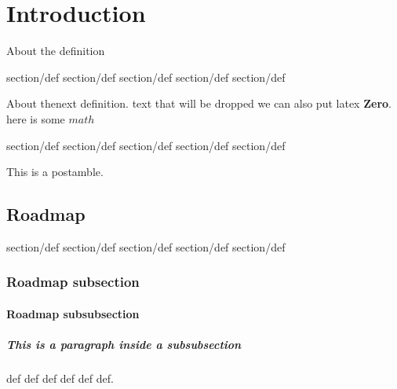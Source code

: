 \chapter{Introduction}
\label{ch:intro}

About the definition

\begin{definition}


section/def section/def section/def
section/def section/def
\end{definition}


About thenext definition.
text that will be dropped we can also put latex  \textbf{Zero}.
here is some $math$

\begin{definition}
section/def section/def section/def
section/def section/def
\end{definition}

This is a postamble.

\section{Roadmap}
\label{sec:roadmap}



\begin{definition}
\label{def:one}
section/def section/def section/def
section/def section/def
\end{definition}



\subsection{Roadmap subsection}

\subsubsection{Roadmap subsubsection}
\paragraph{This is a paragraph inside a subsubsection}

\begin{group}
\begin{definition}
\label{def:title}
  def def def
  def
  def def.
\end{definition}
\end{group}



